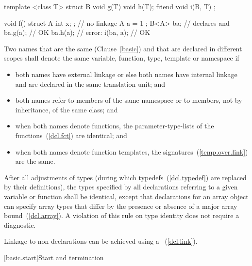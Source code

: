 \begin{example}
\begin{codeblock}
template <class T> struct B {
  void g(T) { }
  void h(T);
  friend void i(B, T) { }
};

void f() {
  struct A { int x; };  // no linkage
  A a = { 1 };
  B<A> ba;              // declares  and 
  ba.g(a);              // OK
  ba.h(a);              // error: 
  i(ba, a);             // OK
}
\end{codeblock}
\end{example}

\pnum
Two names that are the same (Clause~\ref{basic}) and that are declared
in different scopes shall denote the same variable, function,
type, template or namespace if
\begin{itemize}
\item both names have external linkage or else both names have internal
linkage and are declared in the same translation unit; and

\item both names refer to members of the same namespace or to members,
not by inheritance, of the same class; and

\item when both names denote functions, the parameter-type-lists of the
functions~(\ref{dcl.fct}) are identical; and

\item when both names denote function templates, the
signatures~(\ref{temp.over.link}) are the same.
\end{itemize}

\pnum
{}%
%
After all adjustments of types (during which
typedefs~(\ref{dcl.typedef}) are replaced by their definitions), the
types specified by all declarations referring to a given variable or
function shall be identical, except that declarations for an array
object can specify array types that differ by the presence or absence of
a major array bound~(\ref{dcl.array}). A violation of this rule on type
identity does not require a diagnostic.

\pnum
\begin{note} Linkage to non-\Cpp declarations can be achieved using a
~(\ref{dcl.link}). \end{note}%

[basic.start]{Start and termination}


